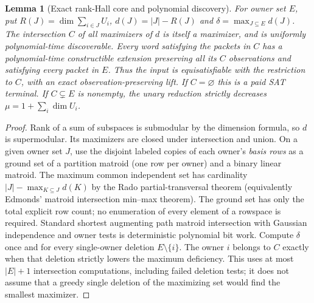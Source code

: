 \documentclass[11pt]{article}
\newtheorem{lemma}[theorem]{Lemma}
\begin{document}
\begin{lemma}[Exact rank-Hall core and polynomial discovery]\label{lem:ds15-core}
For owner set $E$, put $R(J)=\dim\sum_{i\in J}U_i$, $d(J)=|J|-R(J)$ and $\delta=\max_{J\subseteq E}d(J)$. The intersection $C$ of all maximizers of $d$ is itself a maximizer, and is uniformly polynomial-time discoverable. Every word satisfying the packets in $C$ has a polynomial-time constructible extension preserving all its $C$ observations and satisfying every packet in $E$. Thus the input is equisatisfiable with the restriction to $C$, with an exact observation-preserving lift. If $C=\varnothing$ this is a paid SAT terminal. If $C\subsetneq E$ is nonempty, the unary reduction strictly decreases $\mu=1+\sum_i\dim U_i$.
\end{lemma}
\begin{proof}
Rank of a sum of subspaces is submodular by the dimension formula, so $d$ is supermodular. Its maximizers are closed under intersection and union. On a given owner set $J$, use the disjoint labeled copies of each owner's \emph{basis rows} as a ground set of a partition matroid (one row per owner) and a binary linear matroid. The maximum common independent set has cardinality $|J|-\max_{K\subseteq J}d(K)$ by the Rado partial-transversal theorem (equivalently Edmonds' matroid intersection min--max theorem). The ground set has only the total explicit row count; no enumeration of every element of a rowspace is required. Standard shortest augmenting path matroid intersection with Gaussian independence and owner tests is deterministic polynomial bit work. Compute $\delta$ once and for every single-owner deletion $E\setminus\{i\}$. The owner $i$ belongs to $C$ exactly when that deletion strictly lowers the maximum deficiency. This uses at most $|E|+1$ intersection computations, including failed deletion tests; it does not assume that a greedy single deletion of the maximizing set would find the smallest maximizer.


\end{proof}
\end{document}
